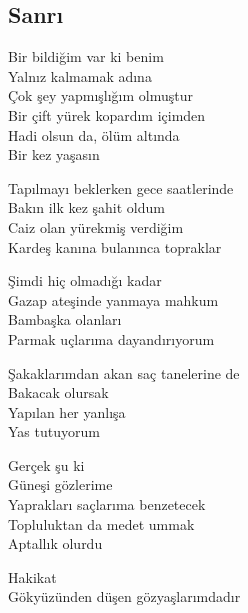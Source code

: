 \subsection{Sanrı}

Bir bildiğim var ki benim \\
Yalnız kalmamak adına \\
Çok şey yapmışlığım olmuştur \\
Bir çift yürek kopardım içimden \\
Hadi olsun da, ölüm altında \\
Bir kez yaşasın

\noindent\newline
Tapılmayı beklerken gece saatlerinde \\
Bakın ilk kez şahit oldum \\
Caiz olan yürekmiş verdiğim \\
Kardeş kanına bulanınca topraklar

\noindent\newline
Şimdi hiç olmadığı kadar \\
Gazap ateşinde yanmaya mahkum \\
Bambaşka olanları \\
Parmak uçlarıma dayandırıyorum

\noindent\newline
Şakaklarımdan akan saç tanelerine de \\
Bakacak olursak \\
Yapılan her yanlışa \\
Yas tutuyorum

\noindent\newline
Gerçek şu ki \\
Güneşi gözlerime \\
Yaprakları saçlarıma benzetecek \\
Topluluktan da medet ummak \\
Aptallık olurdu

\noindent\newline
Hakikat \\
Gökyüzünden düşen gözyaşlarımdadır